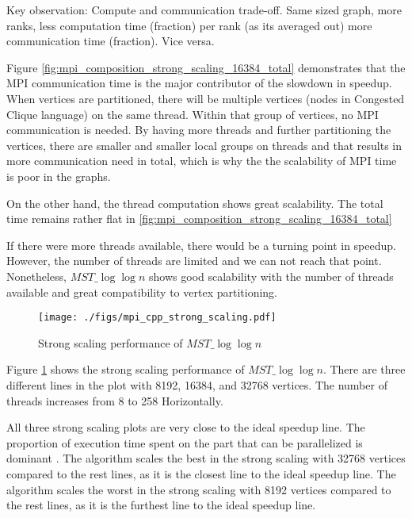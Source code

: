 \documentclass[english, 12pt, a4paper, elec, utf8, a-2b, online]{aaltothesis}
\newcommand{\mstalgo}{$MST\_\log\log{n}$}
\begin{document}
\begin{tcolorbox}[colback=white,colframe=black,boxrule=1pt,arc=0pt]
	Key observation: Compute and communication trade-off. Same sized graph, more ranks, less computation time (fraction) per rank (as its averaged out) more communication time (fraction). Vice versa.
\end{tcolorbox}

Figure \cref{fig:mpi_composition_strong_scaling_16384_total} demonstrates that the MPI communication time is the major contributor of the slowdown in speedup. When vertices are partitioned, there will be multiple vertices (nodes in Congested Clique language) on the same thread. Within that group of vertices, no MPI communication is needed. By having more threads and further partitioning the vertices, there are smaller and smaller local groups on threads and that results in more communication need in total, which is why the the scalability of MPI time is poor in the graphs.

On the other hand, the thread computation shows great scalability. The total time remains rather flat in \cref{fig:mpi_composition_strong_scaling_16384_total}

If there were more threads available, there would be a turning point in speedup. However, the number of threads are limited and we can not reach that point. Nonetheless, \mstalgo{} shows good scalability with the number of threads available and great compatibility to vertex partitioning.

\begin{figure}[h]
	\centering
		\texttt{[image: ./figs/mpi\_cpp\_strong\_scaling.pdf]}
	\caption{Strong scaling performance of \mstalgo{}}
	\label{fig:mpi_cpp_strong_scaling}
\end{figure}

Figure \cref{fig:mpi_cpp_strong_scaling} shows the strong scaling performance of \mstalgo{}. There are three different lines in the plot with 8192, 16384, and 32768 vertices. The number of threads increases from 8 to 258 Horizontally. 

All three strong scaling plots are very close to the ideal speedup line. The proportion of execution time spent on the part that can be parallelized is dominant \cite{HPCScaling}. The algorithm scales the best in the strong scaling with 32768 vertices compared to the rest lines, as it is the closest line to the ideal speedup line. The algorithm scales the worst in the strong scaling with 8192 vertices compared to the rest lines, as it is the furthest line to the ideal speedup line. 
\end{document}
